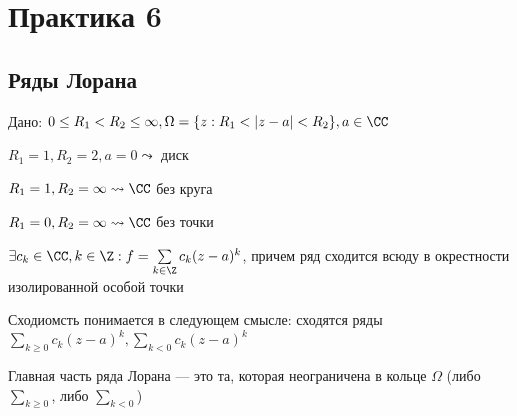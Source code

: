 \section{Практика 6}
\subsection{Ряды Лорана}
Дано: $0 \leq R_1 < R_2 \leq \infty, \Omega = \{z: R_1 < |z - a| < R_2\}, a \in \CC$

\begin{exmpl}
    $R_1 = 1, R_2 = 2, a = 0 \leadsto$ диск  
\end{exmpl}

\begin{exmpl}
    $R_1 = 1, R_2 = \infty \leadsto \CC $ без круга 
\end{exmpl}

\begin{exmpl}
    $R_1 = 0, R_2 = \infty \leadsto \CC$ без точки 
\end{exmpl}

\begin{thm}
    $\exists c_k \in \CC, k \in \Z: f = \sum\limits_{k \in \Z}c_k(z - a)^k$, причем ряд сходится всюду в окрестности изолированной особой точки
\end{thm}

\begin{remrk}
    Сходиомсть понимается в следующем смысле: сходятся ряды $\sum\limits_{k \geq 0} c_k(z - a)^k, \sum\limits_{k < 0}c_k(z - a)^k$
\end{remrk}

\begin{df}
    Главная часть ряда Лорана --- это та, которая неограничена в кольце $\Omega$ (либо $\sum_{k \geq 0}$, либо $\sum_{k < 0}$)
\end{df}

